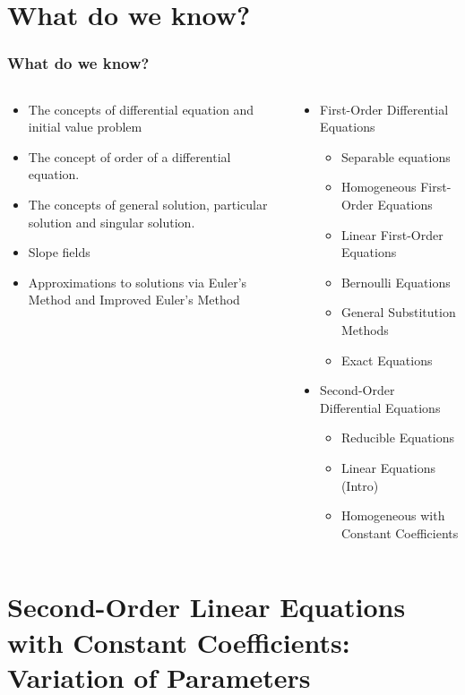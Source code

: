 \documentclass[9pt,xcolor=x11names,compress]{beamer}
\begin{document}
\section{What do we know?}
\begin{frame}\frametitle{What do we know?}
\begin{columns}[T]
\begin{column}{0.45\linewidth}
\begin{itemize}
\item The concepts of \alert{differential equation} and \alert{initial value problem}
\item The concept of \alert{order} of a differential equation.
\item The concepts of \alert{general solution}, \alert{particular solution} and \alert{singular solution}.
\item \alert{Slope fields}
\item Approximations to solutions via \alert{Euler's Method} and \alert{Improved Euler's Method}
\end{itemize} 
\end{column}
\begin{column}{0.55\linewidth}
\begin{itemize}
\item First-Order Differential Equations
\begin{itemize}
\item Separable equations 
\item Homogeneous First-Order Equations 
\item Linear First-Order Equations 
\item Bernoulli Equations 
\item General Substitution Methods
\item Exact Equations 
\end{itemize}
\item Second-Order Differential Equations
\begin{itemize}
	\item Reducible Equations
	\item Linear Equations (Intro)
	\item Homogeneous with Constant Coefficients
\end{itemize}
\end{itemize}
\end{column}
\end{columns}
\end{frame}

\section[Variation of Parameters]{Second-Order Linear Equations with Constant Coefficients: Variation of Parameters}
\end{document}

